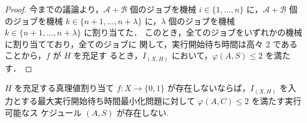 \documentclass[12pt]{optlab-bachelor}
\begin{document}
\begin{proof}
  今までの議論より，$\mathcal{A} + \mathcal{B}$ 個のジョブを機械 $i \in
  \{1,\ldots,n\}$ に，$\mathcal{A} + \mathcal{B}$ 個のジョブを機械 $k \in\{n + 1, \ldots, n + \lambda\}$ に，$\lambda$ 個のジョブを機械 $k \in\{n + 1, \ldots, n + \lambda\}$ に割り当てた．
  このとき，全てのジョブをいずれかの機械に割り当てており，全てのジョブに
  関して，実行開始待ち時間は高々 2 であることから，$f$ が $H$ を充足す
  るとき，$I_{(X,H)}$ において，$\varphi(A,S) \le 2$ を満たす．
\end{proof}

\begin{lemma}\label{l_6}
  $H$ を充足する真理値割り当て $f : X \to \{0,1\}$ が存在しないならば，$I_{(X,H)}$ を入力とする最大実行開始待ち時間最小化問題に対して
  $\varphi(A, C) \le 2$ を満たす実行可能なス
  ケジュール $(A, S)$ が存在しない.
\end{lemma}
\end{document}
